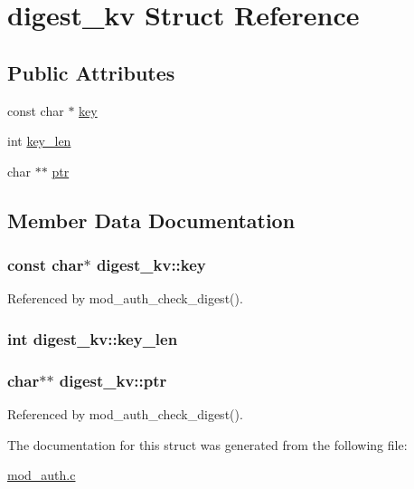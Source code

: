 \hypertarget{structdigest__kv}{\section{digest\-\_\-kv Struct Reference}
\label{structdigest__kv}
}
\subsection*{Public Attributes}
\begin{DoxyCompactItemize}
\item 
const char $\ast$ \hyperlink{structdigest__kv_aed7f223734d77eae4107d115e13d3258}{key}
\item 
int \hyperlink{structdigest__kv_a9553e0166e72858d5f573edab5ae05f2}{key\-\_\-len}
\item 
char $\ast$$\ast$ \hyperlink{structdigest__kv_a8a8b736049d6d84a9aed805a1d41071a}{ptr}
\end{DoxyCompactItemize}


\subsection{Member Data Documentation}
\hypertarget{structdigest__kv_aed7f223734d77eae4107d115e13d3258}{
\subsubsection[{key}]{\setlength{\rightskip}{0pt plus 5cm}const char$\ast$ digest\-\_\-kv\-::key}}\label{structdigest__kv_aed7f223734d77eae4107d115e13d3258}


Referenced by mod\-\_\-auth\-\_\-check\-\_\-digest().

\hypertarget{structdigest__kv_a9553e0166e72858d5f573edab5ae05f2}{
\subsubsection[{key\-\_\-len}]{\setlength{\rightskip}{0pt plus 5cm}int digest\-\_\-kv\-::key\-\_\-len}}\label{structdigest__kv_a9553e0166e72858d5f573edab5ae05f2}
\hypertarget{structdigest__kv_a8a8b736049d6d84a9aed805a1d41071a}{
\subsubsection[{ptr}]{\setlength{\rightskip}{0pt plus 5cm}char$\ast$$\ast$ digest\-\_\-kv\-::ptr}}\label{structdigest__kv_a8a8b736049d6d84a9aed805a1d41071a}


Referenced by mod\-\_\-auth\-\_\-check\-\_\-digest().



The documentation for this struct was generated from the following file\-:\begin{DoxyCompactItemize}
\item 
\hyperlink{mod__auth_8c}{mod\-\_\-auth.\-c}\end{DoxyCompactItemize}

